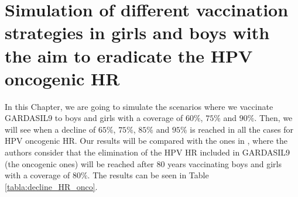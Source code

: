 \chapter{Simulation of different vaccination strategies in girls and boys with the aim to eradicate the HPV oncogenic HR}\label{vaccinationStrategies}
In this Chapter, we are going to simulate the scenarios where we vaccinate GARDASIL9 to boys and girls with a coverage of $60\%$, $75\%$ and $90\%$. Then, we will see when a decline of $65\%$, $75\%$, $85\%$ and $95\%$ is reached in all the cases for HPV oncogenic HR. Our results will be compared with the ones in \cite{Brisson2016}, where the authors consider that the elimination of the HPV HR included in GARDASIL9 (the oncogenic ones) will be reached after $80$ years vaccinating boys and girls with a coverage of $80\%$. The results can be seen in Table \ref{tabla:decline_HR_onco}.

